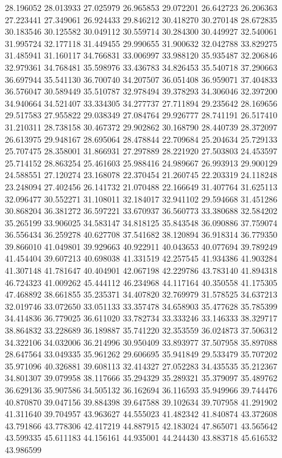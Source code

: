 28.196052
28.013933
27.025979
26.965853
29.072201
26.642723
26.206363
27.223441
27.349061
26.924433
29.846212
30.418270
30.270148
28.672835
30.183546
30.125582
30.049112
30.559714
30.284300
30.449927
32.540061
31.995724
32.177118
31.449455
29.990655
31.900632
32.042788
33.829275
31.485941
31.160117
34.766831
33.006997
33.988120
35.935487
32.206846
32.979361
34.768481
35.598976
33.436783
34.826453
35.540718
37.290663
36.697944
35.541130
36.700740
34.207507
36.051408
36.959071
37.404833
36.576047
30.589449
35.510787
32.978494
39.378293
34.306046
32.397200
34.940664
34.521407
33.334305
34.277737
27.711894
29.235642
28.169656
29.517583
27.955822
29.038349
27.084764
29.926777
28.741191
26.517410
31.210311
28.738158
30.467372
29.902862
30.168790
28.440739
28.372097
26.613975
29.948167
28.695064
28.478844
22.709684
25.204634
25.729133
25.707475
28.358001
31.866931
27.297889
28.221920
27.503803
24.453597
25.714152
28.863254
25.461603
25.988416
24.989667
26.993913
29.900129
24.588551
27.120274
23.168078
22.370454
21.260745
22.203319
24.118248
23.248094
27.402456
26.141732
21.070488
22.166649
31.407764
31.625113
32.096477
30.552271
31.108011
32.184017
32.941102
29.594668
31.451286
30.868204
36.381272
36.597221
33.670937
36.560773
33.380688
32.584202
35.265199
33.906025
34.583147
34.818125
35.843548
36.090886
37.759074
36.556434
36.259278
40.627708
37.541682
38.120894
36.918314
36.779350
39.866010
41.049801
39.929663
40.922911
40.043653
40.077694
39.789249
41.454404
39.607213
40.698038
41.331519
42.257545
41.934386
41.903284
41.307148
41.781647
40.404901
42.067198
42.229786
43.783140
41.894318
46.724323
41.009262
45.444112
46.234968
44.117164
40.350558
41.175305
47.468892
38.661855
35.235371
34.407820
32.769979
31.578525
34.637213
32.019746
33.072650
33.051133
33.357478
34.658903
35.477628
35.785399
34.414836
36.779025
36.611020
33.782734
33.333246
33.146333
38.329717
38.864832
33.228689
36.189887
35.741220
32.353559
36.024873
37.506312
34.322106
34.032006
36.214996
30.950409
33.893977
37.507958
35.897088
28.647564
33.049335
35.961262
29.606695
35.941849
29.533479
35.707202
35.971096
40.326881
39.608113
32.414327
27.052283
34.435535
35.212367
34.801307
39.079958
38.117666
35.294329
35.289321
35.379097
35.489762
36.629136
35.907586
34.505132
36.162694
36.116593
35.949966
39.744476
40.870870
39.047156
39.884398
39.647588
39.102634
39.707958
41.291902
41.311640
39.704957
43.963627
44.555023
41.482342
41.840874
43.372608
43.791866
43.778306
42.417219
44.887915
42.183024
47.865071
43.565642
43.599335
45.611183
44.156161
44.935001
44.244430
43.883718
45.616532
43.986599
